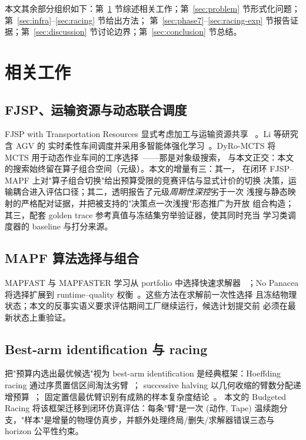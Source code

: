 \documentclass[11pt,a4paper]{article}
\newcommand{\racing}{Budgeted Racing}
\begin{document}
本文其余部分组织如下：第~\ref{sec:related} 节综述相关工作；第~\ref{sec:problem}
节形式化问题；第~\ref{sec:infra}--\ref{sec:racing} 节给出方法；
第~\ref{sec:phase7}--\ref{sec:racing-exp} 节报告证据；第~\ref{sec:discussion}
节讨论边界；第~\ref{sec:conclusion} 节总结。

\section{相关工作}
\label{sec:related}

\subsection{FJSP、运输资源与动态联合调度}

FJSP with Transportation Resources 显式考虑加工与运输资源共享
~\citep{berterottiere2024fjsptransport,sun2023integrated}。Li 等研究含 AGV 的
实时柔性车间调度并采用多智能体强化学习~\citep{li2025realtime}。DyRo-MCTS 将
MCTS 用于动态作业车间的工序选择~\citep{chen2025dyromcts}——那是对象级搜索，
与本文正交：本文的搜索始终留在算子组合空间（元级）。本文的增量有三：其一，
在闭环 FJSP--MAPF 上对"算子组合切换"给出预算受限的竞赛评估与显式计价的切换
决策，运输耦合进入评估口径；其二，透明报告了元级\emph{周期性深控}劣于一次
浅搜与静态映射的严格配对证据，并把被支持的"决策点一次浅搜"形态推广为开放
组合构造；其三，配套 golden trace 参考真值与冻结集穷举验证器，使其同时充当
学习类调度器的 baseline 与打分来源。

\subsection{MAPF 算法选择与组合}

MAPFAST 与 MAPFASTER 学习从 portfolio 中选择快速求解器
~\citep{ren2021mapfast,alkazzi2022mapfaster}；No Panacea 将选择扩展到
runtime--quality 权衡~\citep{chen2024nopanacea}。这些方法在求解前一次性选择
且冻结物理状态；本文的反事实语义要求评估期间工厂继续运行，候选计划提交前
必须在最新状态上重验证。

\subsection{Best-arm identification 与 racing}

把"预算内选出最优候选"视为 best-arm identification 是经典框架：Hoeffding
racing 通过序贯置信区间淘汰劣臂~\citep{maron1994hoeffding}；
successive halving 以几何收缩的臂数分配递增预算~\citep{karnin2013almost}；
固定置信最优臂识别有成熟的样本复杂度结论~\citep{jamieson2014bestarm}。
本文的 \racing{} 将该框架迁移到闭环仿真评估：每条"臂"是一次 (动作, Tape)
温续跑分支，"样本"是增量的物理仿真步，并额外处理终局/删失/求解器错误三态与
horizon 公平性约束。
\end{document}
